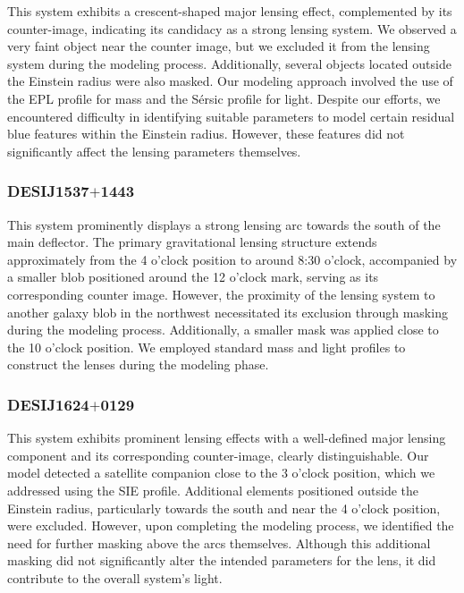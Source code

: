 \documentclass{aa}
\begin{document}
This system exhibits a crescent-shaped major lensing effect, complemented by its counter-image, indicating its candidacy as a strong lensing system. We observed a very faint object near the counter image, but we excluded it from the lensing system during the modeling process. Additionally, several objects located outside the Einstein radius were also masked. Our modeling approach involved the use of the EPL profile for mass and the S\'ersic  profile for light. Despite our efforts, we encountered difficulty in identifying suitable parameters to model certain residual blue features within the Einstein radius. However, these features did not significantly affect the lensing parameters themselves.


\subsubsection{DESIJ1537$+$1443}

This system prominently displays a strong lensing arc towards the south of the main deflector. The primary gravitational lensing structure extends approximately from the 4 o'clock position to around 8:30 o'clock, accompanied by a smaller blob positioned around the 12 o'clock mark, serving as its corresponding counter image. However, the proximity of the lensing system to another galaxy blob in the northwest necessitated its exclusion through masking during the modeling process. Additionally, a smaller mask was applied close to the 10 o'clock position. We employed standard mass and light profiles to construct the lenses during the modeling phase.

\subsubsection{DESIJ1624$+$0129}

This system exhibits prominent lensing effects with a well-defined major lensing component and its corresponding counter-image, clearly distinguishable. Our model detected a satellite companion close to the 3 o'clock position, which we addressed using the SIE profile. Additional elements positioned outside the Einstein radius, particularly towards the south and near the 4 o'clock position, were excluded. However, upon completing the modeling process, we identified the need for further masking above the arcs themselves. Although this additional masking did not significantly alter the intended parameters for the lens, it did contribute to the overall system's light.
\end{document}
